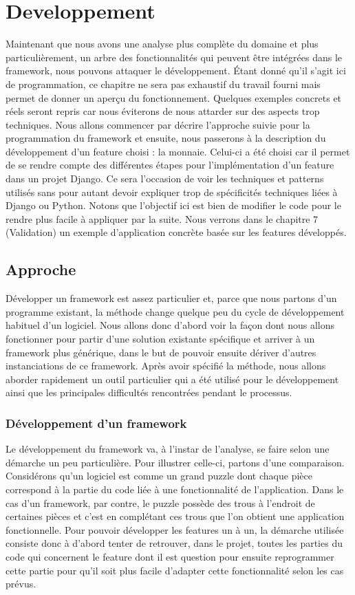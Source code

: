 \section{Developpement}

Maintenant que nous avons une analyse plus complète du domaine et plus particulièrement,  un arbre des fonctionnalités qui peuvent être intégrées dans le framework,  nous pouvons attaquer le développement.  Étant donné qu'il s'agit ici de programmation,  ce chapitre ne sera pas exhaustif du travail fourni mais permet de donner un aperçu du fonctionnement.  Quelques exemples concrets et réels seront repris car nous éviterons de nous attarder sur des aspects trop techniques.  Nous allons commencer par décrire l'approche suivie pour la programmation du framework et ensuite,   nous passerons à la description du développement d'un feature choisi : la monnaie.  Celui-ci a été choisi car il permet de se rendre compte des différentes étapes pour l'implémentation d'un feature dans un projet Django.  Ce sera l'occasion de voir les techniques et patterns utilisés sans pour autant devoir expliquer trop de spécificités techniques liées à Django ou Python.  Notons que l'objectif ici est bien de modifier le code pour le rendre plus facile à appliquer par la suite.  Nous verrons dans le chapitre 7 (Validation) un exemple d'application concrète basée sur les features développés.   

\subsection{Approche}
Développer un framework est assez particulier et,  parce que nous partons d'un programme existant,  la méthode change quelque peu du cycle de développement habituel d'un logiciel.  Nous allons donc d'abord voir la façon dont nous allons fonctionner pour partir d'une solution existante spécifique et arriver à un framework plus générique,  dans le but de pouvoir ensuite dériver d'autres instanciations de ce framework.  Après avoir spécifié la méthode,  nous allons aborder rapidement un outil particulier qui a été utilisé pour le développement ainsi que les principales difficultés rencontrées pendant le processus.

\subsubsection{Développement d'un framework}

Le développement du framework va,  à l'instar de l'analyse,  se faire selon une démarche un peu particulière.  Pour illustrer celle-ci,  partons d'une comparaison.  Considérons qu'un logiciel est comme un grand puzzle dont chaque pièce correspond à la partie du code liée à une fonctionnalité de l'application.  Dans le cas d'un framework,  par contre,  le puzzle possède des trous à l'endroit de certaines pièces et c'est en complétant ces trous que l'on obtient une application fonctionnelle.  Pour pouvoir développer les features un à un,  la démarche utilisée consiste donc à d'abord tenter de retrouver,  dans le projet,  toutes les parties du code qui concernent le feature dont il est question pour ensuite reprogrammer cette partie pour qu'il soit plus facile d'adapter cette fonctionnalité selon les cas prévus.

